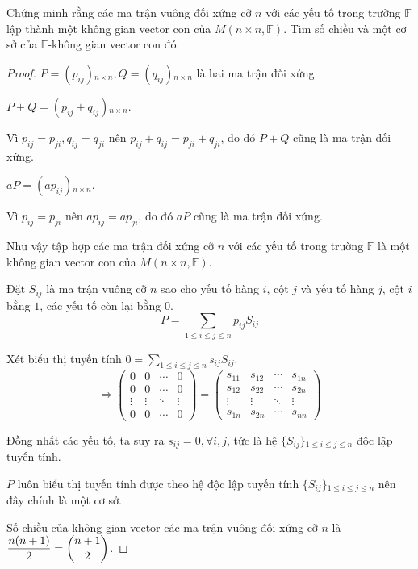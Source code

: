 \begin{exercise}\label{symmetric-matrices}
    Chứng minh rằng các ma trận vuông đối xứng cỡ $n$ với các yếu tố trong trường $\mathbb{F}$ lập thành một không gian vector con của $M(n\times n,\mathbb{F})$. Tìm số chiều và một cơ sở của $\mathbb{F}$-không gian vector con đó.
\end{exercise}

\begin{proof}
    $P = (p_{ij}){}_{n\times n}, Q = (q_{ij}){}_{n\times n}$ là hai ma trận đối xứng.
    
    $P + Q = (p_{ij} + q_{ij}){}_{n\times n}$.
    
    Vì $p_{ij} = p_{ji}, q_{ij} = q_{ji}$ nên $p_{ij} + q_{ij} = p_{ji} + q_{ji}$, do đó $P + Q$ cũng là ma trận đối xứng.
    
    $aP = (ap_{ij}){}_{n\times n}$.
    
    Vì $p_{ij} = p_{ji}$ nên $ap_{ij} = ap_{ji}$, do đó $aP$ cũng là ma trận đối xứng.
    
    Như vậy tập hợp các ma trận đối xứng cỡ $n$ với các yếu tố trong trường $\mathbb{F}$ là một không gian vector con của $M(n\times n,\mathbb{F})$.
    
    Đặt $S_{ij}$ là ma trận vuông cỡ $n$ sao cho yếu tố hàng $i$, cột $j$ và yếu tố hàng $j$, cột $i$ bằng $1$, các yếu tố còn lại bằng $0$.
    \[ P = \displaystyle\sum_{1\le i\le j \le n}p_{ij}S_{ij} \]
    
    Xét biểu thị tuyến tính $0 = \displaystyle\sum_{1\le i\le j\le n}s_{ij}S_{ij}$.
    \[
        \Rightarrow
        \begin{pmatrix}
            0      & 0      & \cdots & 0      \\
            0      & 0      & \cdots & 0      \\
            \vdots & \vdots & \ddots & \vdots \\
            0      & 0      & \cdots & 0
        \end{pmatrix} =
        \begin{pmatrix}
            s_{11} & s_{12} & \cdots & s_{1n} \\
            s_{12} & s_{22} & \cdots & s_{2n} \\
            \vdots & \vdots & \ddots & \vdots \\
            s_{1n} & s_{2n} & \cdots & s_{nn}
        \end{pmatrix}
    \]
    
    Đồng nhất các yếu tố, ta suy ra $s_{ij} = 0,\forall i, j$, tức là hệ $\{S_{ij}\}{}_{1\le i \le j \le n}$ độc lập tuyến tính.
    
    $P$ luôn biểu thị tuyến tính được theo hệ độc lập tuyến tính $\{S_{ij}\}{}_{1\le i \le j \le n}$ nên đây chính là một cơ sở.
    
    Số chiều của không gian vector các ma trận vuông đối xứng cỡ $n$ là $\dfrac{n(n + 1)}{2} = \dbinom{n+1}{2}$.
\end{proof}

